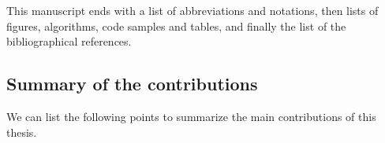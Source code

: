 %
%
This manuscript ends with
a list of abbreviations and notations, then lists of figures, algorithms, code samples and tables,
and finally the list of the bibliographical references.





\subsection{Summary of the contributions}
\label{sec:1:summaryOfContributions}

We can list the following points to summarize the main contributions of this thesis.

